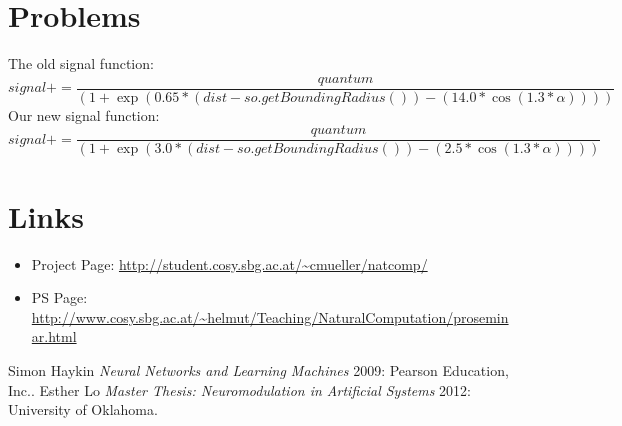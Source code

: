 \documentclass[12pt,fleqn,a4paper]{article}
\begin{document}
\section{Problems}
The old signal function:
\[signal += \frac{quantum}{(1 + \exp(0.65 * (dist - so.getBoundingRadius()) - (14.0 * \cos(1.3 * \alpha))))}\]
Our new signal function:
\[signal += \frac{quantum}{(1 + \exp(3.0 * (dist - so.getBoundingRadius()) - (2.5 * \cos(1.3 * \alpha))))}\]

\newpage
\section{Links}

\begin{itemize}
\item Project Page: \url{http://student.cosy.sbg.ac.at/~cmueller/natcomp/}
\item PS Page: \url{http://www.cosy.sbg.ac.at/~helmut/Teaching/NaturalComputation/proseminar.html}
\end{itemize}


\begin{thebibliography}{1}
Simon Haykin {\em Neural Networks and Learning Machines} 2009: Pearson Education, Inc..
Esther Lo {\em Master Thesis: Neuromodulation in Artificial Systems} 2012: University of Oklahoma.
\end{thebibliography}
\end{document}
